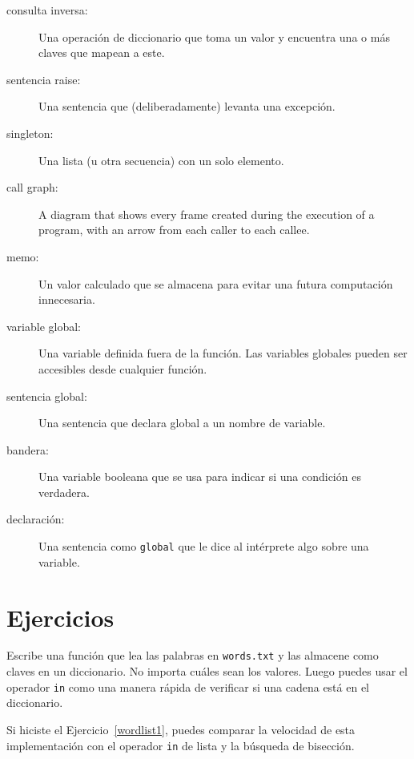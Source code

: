 \documentclass[10pt]{book}
\begin{document}
\begin{description}
\item[consulta inversa:] Una operación de diccionario que toma un valor y encuentra
una o más claves que mapean a este.

\item[sentencia raise:]  Una sentencia que (deliberadamente) levanta una excepción.

\item[singleton:] Una lista (u otra secuencia) con un solo elemento.

\item[call graph:] A diagram that shows every frame created during
the execution of a program, with an arrow from each caller to
each callee.

\item[memo:] Un valor calculado que se almacena para evitar una futura
computación innecesaria.

\item[variable global:]  Una variable definida fuera de la función. Las
variables globales pueden ser accesibles desde cualquier función.

\item[sentencia global:]  Una sentencia que declara global a un nombre
de variable.

\item[bandera:] Una variable booleana que se usa para indicar si una condición
es verdadera.

\item[declaración:] Una sentencia como {\tt global} que le dice al
intérprete algo sobre una variable.

\end{description}


\section{Ejercicios}

\begin{exercise}
\label{wordlist2}

Escribe una función que lea las palabras en {\tt words.txt} y
las almacene como claves en un diccionario.  No importa cuáles sean
los valores.  Luego puedes usar el operador {\tt in}
como una manera rápida de verificar si una cadena está en
el diccionario.

Si hiciste el Ejercicio~\ref{wordlist1}, puedes comparar la velocidad
de esta implementación con el operador {\tt in} de lista y la
búsqueda de bisección.

\end{exercise}
\end{document}

